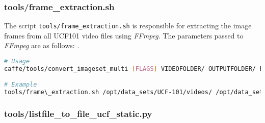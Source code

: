 \subsubsection{tools/frame\_extraction.sh}
\label{subsec:frame_extraction}
The script \texttt{tools/frame\_extraction.sh} is responsible for extracting the image frames from all UCF101 video files using \emph{FFmpeg}.
The parameters passed to \emph{FFmpeg} are as follows: .
\begin{lstlisting}[language=sh, caption=convert\_image\_multi.sh, label=lst:convert_imageset]
# Usage
caffe/tools/convert_imageset_multi [FLAGS] VIDEOFOLDER/ OUTPUTFOLDER/ FRAMERATE

# Example
tools/frame\_extraction.sh /opt/data_sets/UCF-101/videos/ /opt/data_sets/UCF-101/frames_10fps/ 10
\end{lstlisting}

\subsubsection{tools/listfile\_to\_file\_ucf\_static.py}
\label{subsec:listfile_to_file_ucf_static}